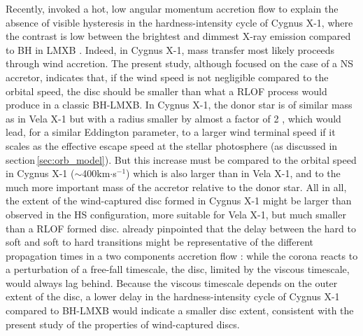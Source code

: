 \documentclass{aa}
\makeatletter
\newcommand*{\rlof}{RLOF\@\xspace}
\newcommand*{\ns}{NS\@\xspace}
\makeatother
\begin{document}
Recently, \cite{Taam2018} invoked a hot, low angular momentum accretion flow to explain the absence of visible hysteresis in the hardness-intensity cycle of Cygnus X-1, where the contrast is low between the brightest and dimmest X-ray emission compared to BH in LMXB \citep{Grinberg:2014ux}. Indeed, in Cygnus X-1, mass transfer most likely proceeds through wind accretion. The present study, although focused on the case of a \ns accretor, indicates that, if the wind speed is not negligible compared to the orbital speed, the disc should be smaller than what a \rlof process would produce in a classic BH-LMXB. In Cygnus X-1, the donor star is of similar mass as in Vela X-1 but with a radius smaller by almost a factor of 2 \citep{Orosz2011}, which would lead, for a similar Eddington parameter, to a larger wind terminal speed if it scales as the effective escape speed at the stellar photosphere (as discussed in section\,\ref{sec:orb_model}). But this increase must be compared to the orbital speed in Cygnus X-1 ($\sim$400km$\cdot$s$^{-1}$) which is also larger than in Vela X-1, and to the much more important mass of the accretor relative to the donor star. All in all, the extent of the wind-captured disc formed in Cygnus X-1 might be larger than observed in the HS configuration, more suitable for Vela X-1, but much smaller than a \rlof formed disc. \cite{Smith2001} already pinpointed that the delay between the hard to soft and soft to hard transitions might be representative of the different propagation times in a two components accretion flow : while the corona reacts to a perturbation of a free-fall timescale, the disc, limited by the viscous timescale, would always lag behind. Because the viscous timescale depends on the outer extent of the disc, a lower delay in the hardness-intensity cycle of Cygnus X-1 compared to BH-LMXB would indicate a smaller disc extent, consistent with the present study of the properties of wind-captured discs.
\end{document}
